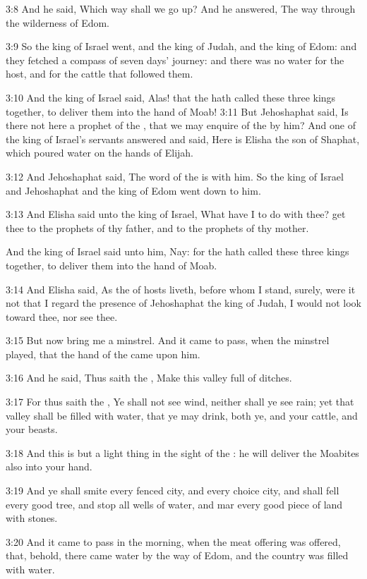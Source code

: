 3:8 And he said, Which way shall we go up? And he answered, The way
through the wilderness of Edom.

3:9 So the king of Israel went, and the king of Judah, and the king of
Edom: and they fetched a compass of seven days' journey: and there was
no water for the host, and for the cattle that followed them.

3:10 And the king of Israel said, Alas! that the \LORD hath called
these three kings together, to deliver them into the hand of Moab!
3:11 But Jehoshaphat said, Is there not here a prophet of the \LORD,
that we may enquire of the \LORD by him? And one of the king of
Israel's servants answered and said, Here is Elisha the son of
Shaphat, which poured water on the hands of Elijah.

3:12 And Jehoshaphat said, The word of the \LORD is with him. So the
king of Israel and Jehoshaphat and the king of Edom went down to him.

3:13 And Elisha said unto the king of Israel, What have I to do with
thee?  get thee to the prophets of thy father, and to the prophets of
thy mother.

And the king of Israel said unto him, Nay: for the \LORD hath called
these three kings together, to deliver them into the hand of Moab.

3:14 And Elisha said, As the \LORD of hosts liveth, before whom I
stand, surely, were it not that I regard the presence of Jehoshaphat
the king of Judah, I would not look toward thee, nor see thee.

3:15 But now bring me a minstrel. And it came to pass, when the
minstrel played, that the hand of the \LORD came upon him.

3:16 And he said, Thus saith the \LORD, Make this valley full of
ditches.

3:17 For thus saith the \LORD, Ye shall not see wind, neither shall ye
see rain; yet that valley shall be filled with water, that ye may
drink, both ye, and your cattle, and your beasts.

3:18 And this is but a light thing in the sight of the \LORD: he will
deliver the Moabites also into your hand.

3:19 And ye shall smite every fenced city, and every choice city, and
shall fell every good tree, and stop all wells of water, and mar every
good piece of land with stones.

3:20 And it came to pass in the morning, when the meat offering was
offered, that, behold, there came water by the way of Edom, and the
country was filled with water.

